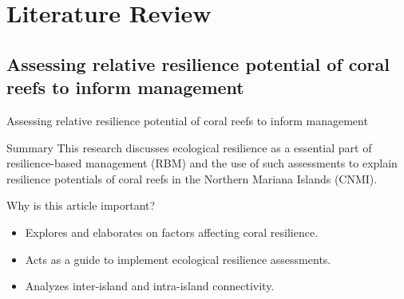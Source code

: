 \documentclass{beamer}
\begin{document}
\section{Literature Review}

\subsection{Assessing relative resilience potential of coral reefs to inform management}
\begin{frame}{Assessing relative resilience potential of coral reefs to inform management}
    \begin{block}{Summary}
        \small{This research discusses ecological resilience as a essential part of resilience-based management (RBM) and the use of such assessments to explain resilience potentials of coral reefs in the Northern Mariana Islands (CNMI).}
    \end{block}
    Why is this article important?
    \begin{itemize}
        \item Explores and elaborates on factors affecting coral resilience.
        \item Acts as a guide to implement ecological resilience assessments.
        \item Analyzes inter-island and intra-island connectivity.
    \end{itemize}
\end{frame}
\end{document}
